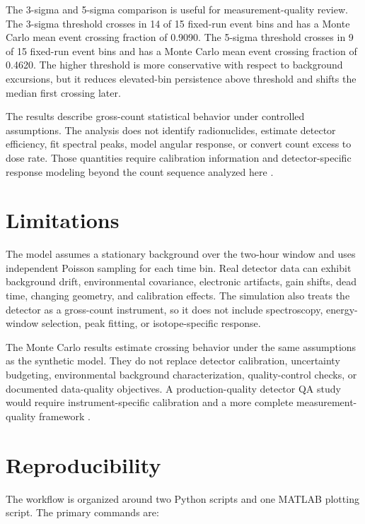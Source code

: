 \documentclass[11pt,twocolumn]{article}
\begin{document}
The 3-sigma and 5-sigma comparison is useful for measurement-quality review. The 3-sigma threshold crosses in 14 of 15 fixed-run event bins and has a Monte Carlo mean event crossing fraction of 0.9090. The 5-sigma threshold crosses in 9 of 15 fixed-run event bins and has a Monte Carlo mean event crossing fraction of 0.4620. The higher threshold is more conservative with respect to background excursions, but it reduces elevated-bin persistence above threshold and shifts the median first crossing later.

The results describe gross-count statistical behavior under controlled assumptions. The analysis does not identify radionuclides, estimate detector efficiency, fit spectral peaks, model angular response, or convert count excess to dose rate. Those quantities require calibration information and detector-specific response modeling beyond the count sequence analyzed here \cite{Knoll2010,MARLAP2004}.

\section{Limitations}

The model assumes a stationary background over the two-hour window and uses independent Poisson sampling for each time bin. Real detector data can exhibit background drift, environmental covariance, electronic artifacts, gain shifts, dead time, changing geometry, and calibration effects. The simulation also treats the detector as a gross-count instrument, so it does not include spectroscopy, energy-window selection, peak fitting, or isotope-specific response.

The Monte Carlo results estimate crossing behavior under the same assumptions as the synthetic model. They do not replace detector calibration, uncertainty budgeting, environmental background characterization, quality-control checks, or documented data-quality objectives. A production-quality detector QA study would require instrument-specific calibration and a more complete measurement-quality framework \cite{ISO11929,MARLAP2004}.

\section{Reproducibility}

The workflow is organized around two Python scripts and one MATLAB plotting script. The primary commands are:
\end{document}
